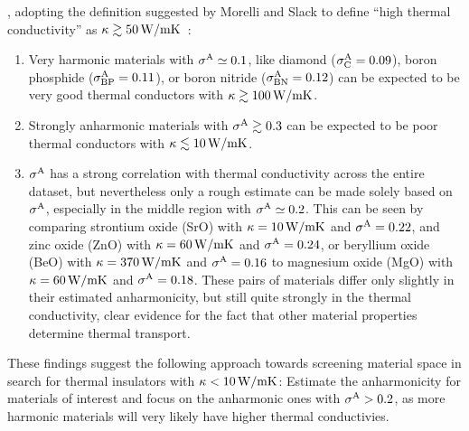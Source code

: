 , adopting the definition suggested by Morelli and Slack to define ``high thermal conductivity'' as $\kappa \gtrsim 50 \, {\rm W/mK}$~\cite{morelLi.2006}:
\begin{enumerate}
	\item Very harmonic materials with $\sigma^\mathrm{A} \simeq 0.1$, like diamond ($\sigma^\mathrm{A}_{\rm C} = 0.09$), boron phosphide ($\sigma^\mathrm{A}_{\rm BP} = 0.11$), or boron nitride ($\sigma^\mathrm{A}_{\rm BN} = 0.12$) can be expected to be very good thermal conductors with $\kappa \gtrsim 100\,{\rm W/mK}$.
	\item Strongly anharmonic materials with $\sigma^\mathrm{A} \gtrsim 0.3$ can be expected to be poor thermal conductors with $\kappa \lesssim 10\,{\rm W/mK}$.
	\item $\sigma^\mathrm{A}$ has a strong correlation with thermal conductivity across the entire dataset, but nevertheless only a rough estimate can be made solely based on $\sigma^\mathrm{A}$, especially in the middle region with $\sigma^\mathrm{A} \simeq 0.2$. This can be seen by comparing strontium oxide (SrO) with $\kappa = 10\,{\rm W/mK}$ and $\sigma^\mathrm{A} = 0.22$, and zinc oxide (ZnO) with $\kappa = 60\,{\rm W/mK}$ and $\sigma^\mathrm{A} = 0.24$, or beryllium oxide (BeO) with $\kappa = 370\,{\rm W/mK}$ and $\sigma^\mathrm{A} = 0.16$ to magnesium oxide (MgO) with $\kappa = 60\,{\rm W/mK}$ and $\sigma^\mathrm{A} = 0.18$. These pairs of materials differ only slightly in their estimated anharmonicity, but still quite strongly in the thermal conductivity, clear evidence for the fact that other material properties determine thermal transport. 
\end{enumerate}

{These findings suggest the following approach} towards screening material space in search for thermal insulators with $\kappa < 10\,{\rm W/mK}$: Estimate the anharmonicity for materials of interest and focus on the anharmonic ones with $\sigma^\mathrm{A} > 0.2$, as more harmonic materials will very likely have higher thermal conductivies.

